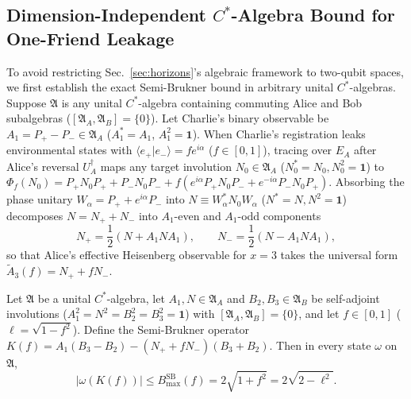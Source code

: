 \subsection{Dimension-Independent $C^*$-Algebra Bound for One-Friend Leakage}

To avoid restricting Sec.~\ref{sec:horizons}'s algebraic framework to two-qubit spaces, we first establish the exact Semi-Brukner bound in arbitrary unital $C^*$-algebras. Suppose $\mathfrak{A}$ is any unital $C^*$-algebra containing commuting Alice and Bob subalgebras ($[\mathfrak{A}_A, \mathfrak{A}_B] = \{0\}$). Let Charlie's binary observable be $A_1 = P_+ - P_- \in \mathfrak{A}_A$ ($A_1^* = A_1$, $A_1^2 = \mathbf{1}$). When Charlie's registration leaks environmental states with $\langle e_+ | e_- \rangle = f e^{i\alpha}$ ($f \in [0, 1]$), tracing over $E_A$ after Alice's reversal $U_A^\dagger$ maps any target involution $N_0 \in \mathfrak{A}_A$ ($N_0^* = N_0, N_0^2 = \mathbf{1}$) to $\Phi_f(N_0) = P_+ N_0 P_+ + P_- N_0 P_- + f(e^{i\alpha} P_+ N_0 P_- + e^{-i\alpha} P_- N_0 P_+)$. Absorbing the phase unitary $W_\alpha = P_+ + e^{i\alpha} P_-$ into $N \equiv W_\alpha^* N_0 W_\alpha$ ($N^* = N, N^2 = \mathbf{1}$) decomposes $N = N_+ + N_-$ into $A_1$-even and $A_1$-odd components
\begin{equation}
    N_+ = \frac{1}{2}(N + A_1 N A_1), \qquad N_- = \frac{1}{2}(N - A_1 N A_1),
    \label{eq:even_odd_decomp}
\end{equation}
so that Alice's effective Heisenberg observable for $x = 3$ takes the universal form $\tilde{A}_3(f) = N_+ + f N_-$.

\begin{theorem}
Let $\mathfrak{A}$ be a unital $C^*$-algebra, let $A_1, N \in \mathfrak{A}_A$ and $B_2, B_3 \in \mathfrak{A}_B$ be self-adjoint involutions ($A_1^2 = N^2 = B_2^2 = B_3^2 = \mathbf{1}$) with $[\mathfrak{A}_A, \mathfrak{A}_B] = \{0\}$, and let $f \in [0, 1]$ ($\ell = \sqrt{1 - f^2}$). Define the Semi-Brukner operator $K(f) = A_1(B_3 - B_2) - (N_+ + f N_-)(B_3 + B_2)$. Then in every state $\omega$ on $\mathfrak{A}$,
\begin{equation}
    |\omega(K(f))| \le B_{\max}^{\mathrm{SB}}(f) = 2\sqrt{1 + f^2} = 2\sqrt{2 - \ell^2}.
    \label{eq:theorem1_bound}
\end{equation}
\end{theorem}

